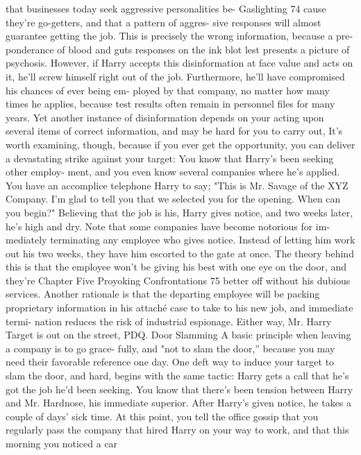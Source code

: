 \documentclass{book}
\begin{document}
that businesses today seek aggressive personalities be-  Gaslighting 
74 
cause they're go-getters, and that a pattern of aggres- 
sive responses will almost guarantee getting the job. 
This is precisely the wrong information, because a pre- 
ponderance of blood and guts responses on the ink blot 
lest presents a picture of psychosis. However, if Harry 
accepts this disinformation at face value and acts on it, 
he'll screw himself right out of the job. Furthermore, 
he'll have compromised his chances of ever being em- 
ployed by that company, no matter how many times he 
applies, because test results often remain in personnel 
files for many years. 
Yet another instance of disinformation depends on your 
acting upon several items of correct information, and may be 
hard for you to carry out, It's worth examining, though, because 
if you ever get the opportunity, you can deliver a devastating 
strike against your target: 
You know that Harry's been seeking other employ- 
ment, and you even know several companies where he's 
applied. You have an accomplice telephone Harry to 
say; 
"This is Mr. Savage of the XYZ Company. I'm glad 
to tell you that we selected you for the opening. When 
can you begin?" 
Believing that the job is his, Harry gives notice, and 
two weeks later, he's high and dry. 
Note that some companies have become notorious for im- 
mediately terminating any employee who gives notice. Instead 
of letting him work out his two weeks, they have him escorted 
to the gate at once. The theory behind this is that the employee 
won't be giving his best with one eye on the door, and they're 
Chapter Five 
Proyoking Confrontations 
75 
better off without his dubious services. Another rationale is that 
the departing employee will be packing proprietary information 
in his attaché case to take to his new job, and immediate termi- 
nation reduces the risk of industrial espionage. Either way, Mr. 
Harry Target is out on the street, PDQ. 
Door Slamming 
A basic principle when leaving a company is to go grace- 
fully, and "not to slam the door,” because you may need their 
favorable reference one day. One deft way to induce your target 
to slam the door, and hard, begins with the same tactic: 
Harry gets a call that he's got the job he'd been 
seeking. You know that there's been tension between 
Harry and Mr. Hardnose, his immediate superior. After 
Harry's given notice, he takes a couple of days’ sick 
time. At this point, you tell the office gossip that you 
regularly pass the company that hired Harry on your 
way to work, and that this morning you noticed a car 
\end{document}
